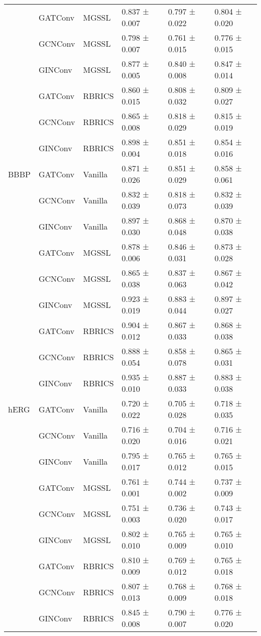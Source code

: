 \begin{tabular}{|l|l|l|l|l|l|}
 & GATConv & MGSSL & 0.837 ± 0.007 & 0.797 ± 0.022 & 0.804 ± 0.020 \\
 & GCNConv & MGSSL & 0.798 ± 0.007 & 0.761 ± 0.015 & 0.776 ± 0.015 \\
 & GINConv & MGSSL & 0.877 ± 0.005 & 0.840 ± 0.008 & 0.847 ± 0.014 \\
 & GATConv & RBRICS & 0.860 ± 0.015 & 0.808 ± 0.032 & 0.809 ± 0.027 \\
 & GCNConv & RBRICS & 0.865 ± 0.008 & 0.818 ± 0.029 & 0.815 ± 0.019 \\
 & GINConv & RBRICS & 0.898 ± 0.004 & 0.851 ± 0.018 & 0.854 ± 0.016 \\
BBBP & GATConv & Vanilla & 0.871 ± 0.026 & 0.851 ± 0.029 & 0.858 ± 0.061 \\
 & GCNConv & Vanilla & 0.832 ± 0.039 & 0.818 ± 0.073 & 0.832 ± 0.039 \\
 & GINConv & Vanilla & 0.897 ± 0.030 & 0.868 ± 0.048 & 0.870 ± 0.038 \\
 & GATConv & MGSSL & 0.878 ± 0.006 & 0.846 ± 0.031 & 0.873 ± 0.028 \\
 & GCNConv & MGSSL & 0.865 ± 0.038 & 0.837 ± 0.063 & 0.867 ± 0.042 \\
 & GINConv & MGSSL & 0.923 ± 0.019 & 0.883 ± 0.044 & 0.897 ± 0.027 \\
 & GATConv & RBRICS & 0.904 ± 0.012 & 0.867 ± 0.033 & 0.868 ± 0.038 \\
 & GCNConv & RBRICS & 0.888 ± 0.054 & 0.858 ± 0.078 & 0.865 ± 0.031 \\
 & GINConv & RBRICS & 0.935 ± 0.010 & 0.887 ± 0.033 & 0.883 ± 0.038 \\
hERG & GATConv & Vanilla & 0.720 ± 0.022 & 0.705 ± 0.028 & 0.718 ± 0.035 \\
 & GCNConv & Vanilla & 0.716 ± 0.020 & 0.704 ± 0.016 & 0.716 ± 0.021 \\
 & GINConv & Vanilla & 0.795 ± 0.017 & 0.765 ± 0.012 & 0.765 ± 0.015 \\
 & GATConv & MGSSL & 0.761 ± 0.001 & 0.744 ± 0.002 & 0.737 ± 0.009 \\
 & GCNConv & MGSSL & 0.751 ± 0.003 & 0.736 ± 0.020 & 0.743 ± 0.017 \\
 & GINConv & MGSSL & 0.802 ± 0.010 & 0.765 ± 0.009 & 0.765 ± 0.010 \\
 & GATConv & RBRICS & 0.810 ± 0.009 & 0.769 ± 0.012 & 0.765 ± 0.018 \\
 & GCNConv & RBRICS & 0.807 ± 0.013 & 0.768 ± 0.009 & 0.768 ± 0.018 \\
 & GINConv & RBRICS & 0.845 ± 0.008 & 0.790 ± 0.007 & 0.776 ± 0.020 \\
\hline
\end{tabular}
